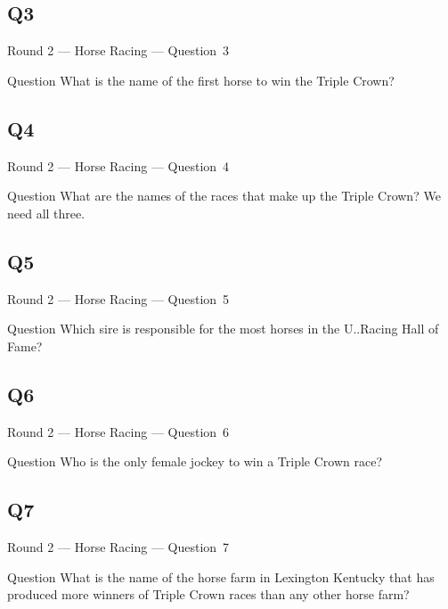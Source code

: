 \documentclass[11pt,draft]{beamer}
\begin{document}
\subsection*{Q3}
\begin{frame}[t]{Round 2 --- Horse Racing --- \mbox{Question 3}}
    \begin{block}{Question}
        What is the name of the first horse to win the Triple Crown?
    \end{block}
\end{frame}
\subsection*{Q4}
\begin{frame}[t]{Round 2 --- Horse Racing --- \mbox{Question 4}}
    \begin{block}{Question}
        What are the names of the races that make up the Triple Crown? We need all three.
    \end{block}
\end{frame}
\subsection*{Q5}
\begin{frame}[t]{Round 2 --- Horse Racing --- \mbox{Question 5}}
    \begin{block}{Question}
        Which sire is responsible for the most horses in the U.\@S.\@ Racing Hall of Fame?
    \end{block}
\end{frame}
\subsection*{Q6}
\begin{frame}[t]{Round 2 --- Horse Racing --- \mbox{Question 6}}
    \begin{block}{Question}
        Who is the only female jockey to win a Triple Crown race?
    \end{block}
\end{frame}
\subsection*{Q7}
\begin{frame}[t]{Round 2 --- Horse Racing --- \mbox{Question 7}}
    \begin{block}{Question}
        What is the name of the horse farm in Lexington Kentucky that has produced more winners of Triple Crown races than any other horse farm?
    \end{block}
\end{frame}
\end{document}
